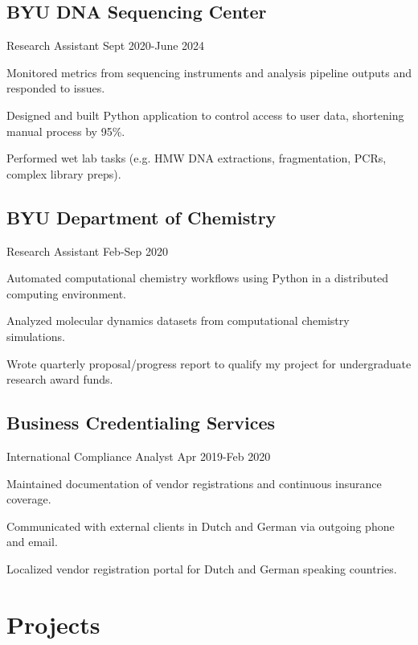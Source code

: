 \documentclass{article}
\newcommand{\role}[1]{
    \vspace{-\baselineskip}
    \vspace{8pt}
    #1
}
\begin{document}
\subsection{BYU DNA Sequencing Center}
\role{Research Assistant \hfill Sept 2020-June 2024}
\begin{blacksquareitemize}\itemsep1pt
    \item Monitored metrics from sequencing instruments and analysis pipeline outputs and responded to issues.
    \item Designed and built Python application to control access to user data, shortening manual process by 95\%.
    \item Performed wet lab tasks (e.g. HMW DNA extractions, fragmentation, PCRs, complex library preps).
\end{blacksquareitemize}

\subsection{BYU Department of Chemistry}
\role{Research Assistant \hfill Feb-Sep 2020}
\begin{blacksquareitemize}\itemsep1pt
    \item Automated computational chemistry workflows using Python in a distributed computing environment.
    \item Analyzed molecular dynamics datasets from computational chemistry simulations.
    \item Wrote quarterly proposal/progress report to qualify my project for undergraduate research award funds.
\end{blacksquareitemize}

\subsection{Business Credentialing Services}
\role{International Compliance Analyst \hfill Apr 2019-Feb 2020}
\begin{blacksquareitemize}\itemsep1pt
    \item Maintained documentation of vendor registrations and continuous insurance coverage.
    \item Communicated with external clients in Dutch and German via outgoing phone and email.
    \item Localized vendor registration portal for Dutch and German speaking countries.
\end{blacksquareitemize}

\section{Projects}
\end{document}
